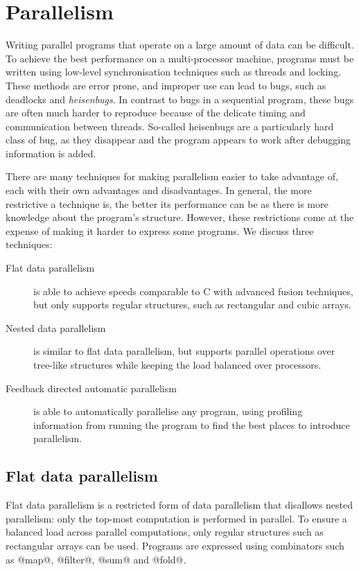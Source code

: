\section{Parallelism}
Writing parallel programs that operate on a large amount of data can be difficult.
To achieve the best performance on a multi-processor machine, programs must be written using low-level synchronisation techniques such as threads and locking.
These methods are error prone, and improper use can lead to bugs, such as deadlocks and \emph{heisenbugs}.
In contrast to bugs in a sequential program, these bugs are often much harder to reproduce because of the delicate timing and communication between threads.
So-called heisenbugs are a particularly hard class of bug, as they disappear and the program appears to work after debugging information is added.

There are many techniques for making parallelism easier to take advantage of,
each with their own advantages and disadvantages.
In general, the more restrictive a technique is, the better its performance can be
as there is more knowledge about the program's structure.
However, these restrictions come at the expense of making it harder to express some programs.
We discuss three techniques:

\begin{description}
\item[Flat   data parallelism]
is able to achieve speeds comparable to C with advanced fusion techniques,
but only supports regular structures, such as rectangular and cubic arrays.

\item[Nested data parallelism]
is similar to flat data parallelism,
but supports parallel operations over tree-like structures
while keeping the load balanced over processors.

\item[Feedback directed automatic parallelism]
is able to automatically parallelise any program,
using profiling information from running the program
to find the best places to introduce parallelism. 
\end{description}


\subsection{Flat data parallelism}
Flat data parallelism is a restricted form of data parallelism that disallows nested parallelism:
only the top-most computation is performed in parallel.
To ensure a balanced load across parallel computations, only regular structures such as rectangular arrays can be used.
Programs are expressed using combinators such as @map@, @filter@, @sum@ and @fold@.

